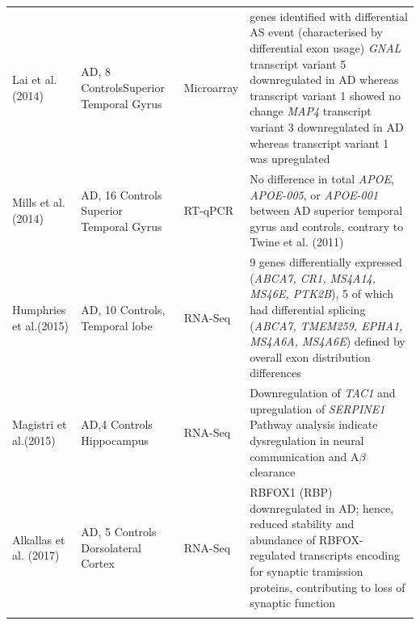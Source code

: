 \begin{changemargin}{1.5cm}
\begin{landscape}
\begin{longtable}[c]{p{3cm}p{4cm}p{3cm}p{16cm}}
			\centering  Lai et al. \newline(2014)\cite{Lai2014} &
			\centering 8 AD, 8 Controls\newline Superior Temporal Gyrus &
			\centering Microarray &
			\tabitem 22 genes identified with differential AS event (characterised by differential exon usage) \newline  \tabitem \textit{GNAL} transcript variant 5 downregulated in AD whereas transcript variant 1 showed no change \newline  \tabitem \textit{MAP4} transcript variant 3 downregulated in AD whereas transcript variant 1 was upregulated\\
			\hdashline[0.5pt/5pt]
			
			\centering Mills et al. (2014)\cite{Mills2014} &
			\centering 14 AD, 16 Controls \newline Superior Temporal Gyrus &
			\centering RT-qPCR &
			No difference in total \textit{APOE}, \textit{APOE-005}, or \textit{APOE-001} between AD superior temporal gyrus and controls, contrary to Twine et al. (2011)\cite{Twine2011} \\
			
			\centering Humphries et al.(2015)\cite{Humphries2015} &
			\centering 10 AD, 10 Controls, \newline Temporal lobe &
			\centering RNA-Seq &
			9 genes differentially expressed (\textit{ABCA7, CR1, MS4A14, MS46E, PTK2B}), 5 of which had differential splicing (\textit{ABCA7, TMEM259, EPHA1, MS4A6A, MS4A6E}) defined by overall exon distribution differences\\
			\hdashline[0.5pt/5pt]
			
			\centering Magistri et al.(2015)\cite{Magistri2015} &
			\centering 4 AD,4 Controls \newline Hippocampus &
			\centering RNA-Seq &
			\tabitem Downregulation of \textit{TAC1} and upregulation of \textit{SERPINE1} \newline 
			\tabitem Pathway analysis indicate dysregulation in neural communication and A$\beta$ clearance \\		
			\hdashline[0.5pt/5pt]
			
			\centering Alkallas et al. (2017)\cite{Alkallas2017} &
			\centering 6 AD, 5 Controls \newline Dorsolateral Cortex &
			\centering RNA-Seq &
			RBFOX1 (RBP) downregulated in AD; hence, reduced stability and abundance of RBFOX-regulated transcripts encoding for synaptic tramission proteins, contributing to loss of synaptic function	\\
			\hdashline[0.5pt/5pt]
			

\end{longtable}
\end{landscape}
\end{changemargin}

